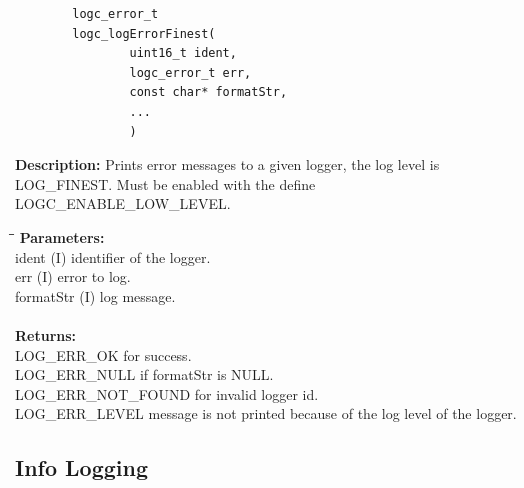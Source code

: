 \documentclass[a4paper, titlepage, 11pt]{article}
\begin{document}
\newpage

\small
\begin{verbatim}
        logc_error_t
        logc_logErrorFinest(
                uint16_t ident,
                logc_error_t err,
                const char* formatStr,
                ...
                )
\end{verbatim}
\normalsize
\textbf{Description:} Prints error messages to a given logger, the log level is LOG\_FINEST. Must be enabled with the define LOGC\_ENABLE\_LOW\_LEVEL.
\begin{tabbing}
\hspace*{1cm}\=\hspace*{2cm}\=\hspace*{0,6cm}\= \kill
\textbf{Parameters:} \\
\> ident \> (I) identifier of the logger. \\
\> err \> (I) error to log. \\
\> formatStr \> (I) log message. \\ \\
\textbf{Returns:} \\
\> LOG\_ERR\_OK for success. \\
\> LOG\_ERR\_NULL if formatStr is NULL. \\
\> LOG\_ERR\_NOT\_FOUND for invalid logger id. \\
\> LOG\_ERR\_LEVEL message is not printed because of the log level of the logger. \\
\end{tabbing}

\newpage

\subsection{Info Logging}
\end{document}

